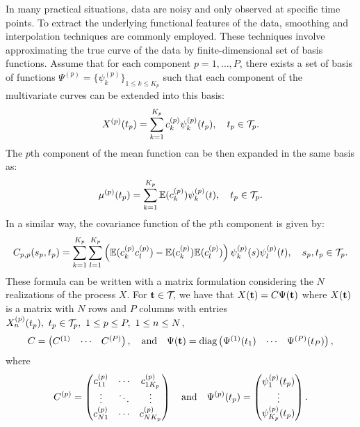 In many practical situations, data are noisy and only observed at specific time points. To extract the underlying functional features of the data, smoothing and interpolation techniques are commonly employed. These techniques involve approximating the true curve of the data by finite-dimensional set of basis functions. Assume that for each component $p = 1, \dots, P$, there exists a set of basis of functions $\Psi^{(p)} = \{\psi_k^{(p)}\}_{1 \leq k \leq K_p}$ such that each component of the multivariate curves can be extended into this basis:
\begin{equation}
X^{(p)}(t_p) = \sum_{k = 1}^{K_p} c^{(p)}_{k}\psi_k^{(p)}(t_p), \quad t_p \in \mathcal{T}_{p}.
\end{equation} 
The $p$th component of the mean function can be then expanded in the same basis as:
\begin{equation}
    \mu^{(p)}(t_p) = \sum_{k = 1}^{K_p} \mathbb{E}(c^{(p)}_{k})\psi_k^{(p)}(t), \quad t_p \in \mathcal{T}_{p}.
\end{equation}
In a similar way, the covariance function of the $p$th component is given by:
\begin{equation}
    C_{p,p}(s_p, t_p) = \sum_{k = 1}^{K_p} \sum_{l = 1}^{K_p} \left(\mathbb{E}(c^{(p)}_{k} c^{(p)}_{l}) - \mathbb{E}(c^{(p)}_{k})\mathbb{E}(c^{(p)}_{l})\right)\psi_k^{(p)}(s)\psi_l^{(p)}(t), \quad s_p, t_p \in \mathcal{T}_{p}.
\end{equation}
These formula can be written with a matrix formulation considering the $N$ realizations of the process $X$. For $\mathbf{t} \in \mathcal{T}_{}$, we have that $X(\mathbf{t}) = C\Psi(\mathbf{t})$ where $X(\mathbf{t})$ is a matrix with $N$ rows and $P$ columns with entries $X_n^{(p)}(t_p),~t_p \in \mathcal{T}_{p},~1 \leq p \leq P,~1 \leq n \leq N$,
\begin{equation}
    C = \begin{pmatrix}
            C^{(1)} & \cdots & C^{(P)} \\
        \end{pmatrix}, \quad \text{and}\quad
    \Psi(\mathbf{t}) = \text{diag}\begin{pmatrix}
        \Psi^{(1)}(t_1) & \cdots & \Psi^{(P)}(t_P)
    \end{pmatrix},
\end{equation}
where
\begin{equation}
C^{(p)} = \begin{pmatrix}
    c^{(p)}_{11} & \cdots & c^{(p)}_{1K_p} \\
    \vdots & \ddots & \vdots \\
    c^{(p)}_{N1} & \cdots & c^{(p)}_{NK_p}
\end{pmatrix} \\
\quad \text{and}\quad
\Psi^{(p)}(t_p) = \begin{pmatrix}
    \psi_1^{(p)}(t_p) \\
    \vdots \\
    \psi_{K_p}^{(p)}(t_p)
\end{pmatrix}.
\end{equation}
